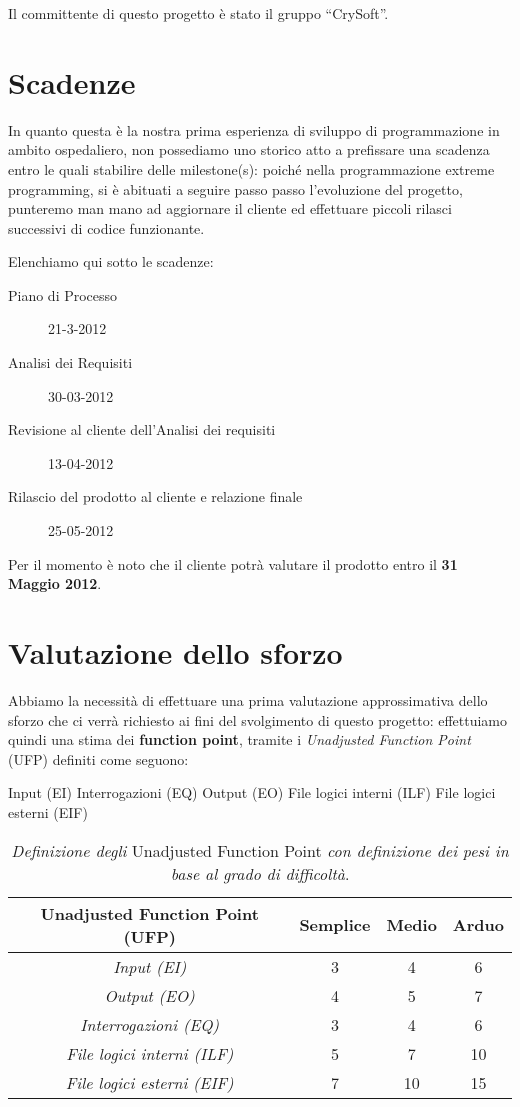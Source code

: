 Il committente di questo progetto è stato il gruppo ``CrySoft''.

\section{Scadenze}
In quanto questa è la nostra prima esperienza di sviluppo di programmazione in ambito
ospedaliero, non possediamo uno storico atto a prefissare una scadenza entro le
quali stabilire delle milestone(s): poiché
nella programmazione extreme programming, si è abituati a seguire passo passo 
l'evoluzione del progetto, punteremo man mano ad aggiornare il cliente ed effettuare
piccoli rilasci successivi di codice funzionante.

Elenchiamo qui sotto le scadenze:
\begin{description}
\item[Piano di Processo] 21-3-2012
\item[Analisi dei Requisiti] 30-03-2012
\item[Revisione al cliente dell'Analisi dei requisiti] 13-04-2012
\item[Rilascio del prodotto al cliente e relazione finale] 25-05-2012
\end{description}
Per il momento è noto che il cliente potrà valutare il prodotto entro il 
\textbf{31 Maggio 2012}.

\section{Valutazione dello sforzo}\label{sec:mfsvds}
Abbiamo la necessità
di effettuare una prima valutazione approssimativa dello sforzo che ci verrà richiesto
ai fini del svolgimento di questo progetto: effettuiamo quindi una stima dei
\textbf{function point}, tramite i \textit{Unadjusted Function Point} (UFP) definiti come
seguono:
\begin{itemize}
\diam Input (EI)
\diam Interrogazioni (EQ)
\diam Output (EO)
\diam File logici interni (ILF)
\diam File logici esterni (EIF)
\end{itemize}

\begin{table}

\centering
\begin{tabular}{cccc}
\toprule
\textbf{Unadjusted Function Point (UFP)} & \textbf{Semplice} & \textbf{Medio} & \textbf {Arduo}\\
\midrule
\textit{Input (EI)} & 3 & 4 & 6\\
\textit{Output (EO)} & 4 & 5 & 7\\
\textit{Interrogazioni (EQ)}& 3 & 4 & 6\\
\textit{File logici interni (ILF)} & 5 & 7 & 10\\
\textit{File logici esterni (EIF)} & 7 & 10 & 15\\
\bottomrule

\end{tabular}
\caption{\textit{Definizione degli} Unadjusted Function Point \textit{ con
definizione dei pesi in base al grado di difficoltà}.}
\label{tab:tdd}

\end{table}

